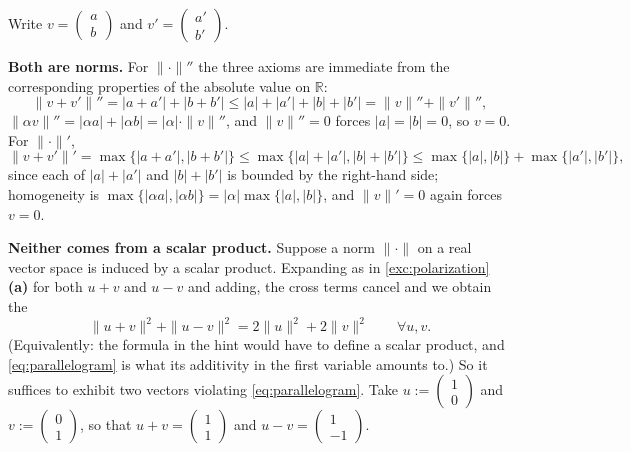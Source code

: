 \begin{exercisesolution}
\label{sol:non_inner_product_norms}
  Write $v = \left(\begin{smallmatrix} a \\ b \end{smallmatrix}\right)$ and $v' = \left(\begin{smallmatrix} a' \\ b' \end{smallmatrix}\right)$.

  \textbf{Both are norms.} For $\| \cdot \|''$ the three axioms are immediate from the corresponding properties of the absolute value on $\mathbb{R}$:
  \[ \|v + v'\|'' = |a+a'| + |b+b'| \le |a| + |a'| + |b| + |b'| = \|v\|'' + \|v'\|'', \]
  $\|\alpha v\|'' = |\alpha a| + |\alpha b| = |\alpha| \cdot \|v\|''$, and $\|v\|'' = 0$ forces $|a| = |b| = 0$, so $v = 0$. For $\| \cdot \|'$,
  \[ \|v+v'\|' = \max\{|a+a'|, |b+b'|\} \le \max\{|a| + |a'|, |b| + |b'|\} \le \max\{|a|,|b|\} + \max\{|a'|,|b'|\}, \]
  since each of $|a|+|a'|$ and $|b|+|b'|$ is bounded by the right-hand side; homogeneity is $\max\{|\alpha a|, |\alpha b|\} = |\alpha| \max\{|a|,|b|\}$, and $\|v\|' = 0$ again forces $v = 0$.

  \textbf{Neither comes from a scalar product.} Suppose a norm $\| \cdot \|$ on a real vector space is induced by a scalar product. Expanding as in \cref{exc:polarization} \textbf{(a)} for both $u+v$ and $u-v$ and adding, the cross terms cancel and we obtain the 
  \begin{equation} \label{eq:parallelogram}
    \|u+v\|^2 + \|u-v\|^2 = 2\|u\|^2 + 2\|v\|^2 \qquad \forall u, v .
  \end{equation}
  (Equivalently: the formula in the hint would have to define a scalar product, and \eqref{eq:parallelogram} is what its additivity in the first variable amounts to.) So it suffices to exhibit two vectors violating \eqref{eq:parallelogram}. Take $u := \left(\begin{smallmatrix} 1 \\ 0 \end{smallmatrix}\right)$ and $v := \left(\begin{smallmatrix} 0 \\ 1 \end{smallmatrix}\right)$, so that $u + v = \left(\begin{smallmatrix} 1 \\ 1 \end{smallmatrix}\right)$ and $u - v = \left(\begin{smallmatrix} 1 \\ -1 \end{smallmatrix}\right)$.


\end{exercisesolution}
